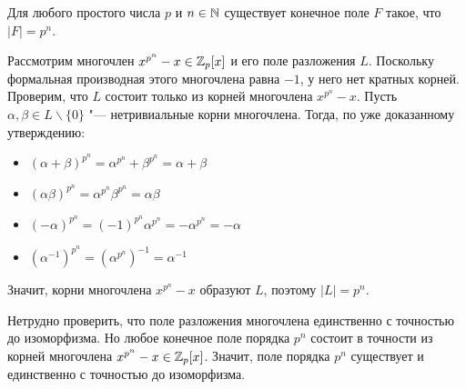 \Th Для любого простого числа $p$ и $n \in \mathbb{N}$ существует конечное поле $F$ такое, что $|F| = p^n$.

\Proof 
	Рассмотрим многочлен $x^{p^n} - x \in \mathbb{Z}_p[x]$ и его поле разложения $L$. Поскольку формальная производная этого многочлена равна $-1$, у него нет кратных корней. Проверим, что $L$ состоит только из корней многочлена $x^{p^n} - x$. Пусть $\alpha, \beta \in L \backslash \{0\}$ "--- нетривиальные корни многочлена. Тогда, по уже доказанному утверждению:
	\begin{itemize}
		\item $(\alpha + \beta)^{p^n} = \alpha^{p^n} + \beta^{p^n} = \alpha + \beta$
		\item $(\alpha\beta)^{p^n} = \alpha^{p^n}\beta^{p^n} = \alpha\beta$
		\item $(-\alpha)^{p^n} = (-1)^{p^n}\alpha^{p^n} = -\alpha^{p^n} = -\alpha$
		\item $(\alpha^{-1})^{p^n} = (\alpha^{p^n})^{-1} = \alpha^{-1}$
	\end{itemize}

	Значит, корни многочлена $x^{p^n} - x$ образуют $L$, поэтому $|L| = p^n$.
\EndProof

\Note Нетрудно проверить, что поле разложения многочлена единственно с точностью до изоморфизма. Но любое конечное поле порядка $p^n$ состоит в точности из корней многочлена $x^{p^n} - x \in \mathbb{Z}_p[x]$. Значит, поле порядка $p^n$ существует и единственно с точностью до изоморфизма.